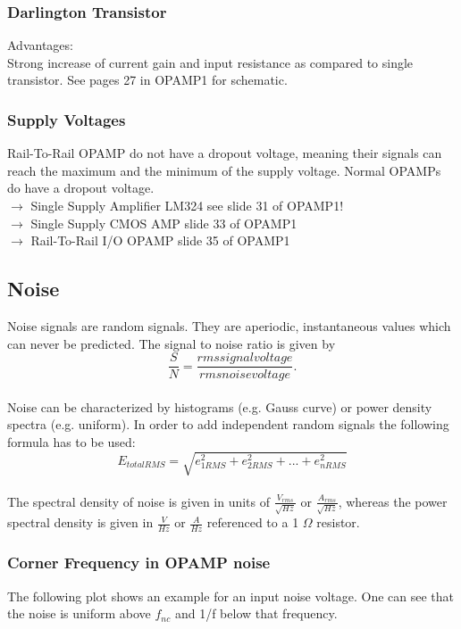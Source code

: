 		\subsubsection{Darlington Transistor}
			Advantages: \\
			Strong increase of current gain and input resistance as compared to single transistor. 
			See pages 27 in OPAMP1 for schematic. 
			
		\subsubsection{Supply Voltages}
			Rail-To-Rail OPAMP do not have a dropout voltage, meaning their signals can reach the maximum and the minimum of the supply voltage. Normal OPAMPs do have a dropout voltage. \\
			$\rightarrow$ Single Supply Amplifier LM324 see slide 31 of OPAMP1! \\
			$\rightarrow$ Single Supply CMOS AMP slide 33 of OPAMP1\\
			$\rightarrow$ Rail-To-Rail I/O OPAMP slide 35 of OPAMP1
	
	\subsection{Noise}
		Noise signals are random signals. They are aperiodic, instantaneous values which can never be predicted. The signal to noise ratio is given by
		\begin{equation}
			\frac{S}{N} = \frac{rms signal voltage}{rms noise voltage}.
		\end{equation}
		\\
		Noise can be characterized by histograms (e.g. Gauss curve) or power density spectra (e.g. uniform). In order to add independent random signals the following formula has to be used: 
		\begin{equation}
			E_{totalRMS} = \sqrt{e_{1RMS}^2 + e_{2RMS}^2 + ... + e_{nRMS}^2}
		\end{equation}
		\\
		The spectral density of noise is given in units of $\frac{V_{rms}}{\sqrt{Hz}}$ or $\frac{A_{rms}}{\sqrt{Hz}}$, whereas the power spectral density is given in $\frac{V}{Hz}$ or $\frac{A}{Hz}$ referenced to a 1 $\Omega$ resistor. \\
		\subsubsection{Corner Frequency in OPAMP noise}
			The following plot shows an example for an input noise voltage. One can see that the noise is uniform above $f_{nc}$ and 1/f below that frequency. 
			
